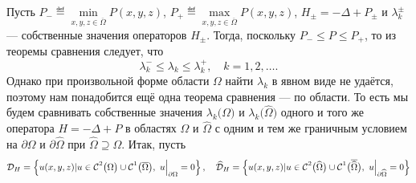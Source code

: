 Пусть $\displaystyle P_{-}\eqdef\min\limits_{x,y,z\in\overline{\Omega}}P(x,y,z)$, $\displaystyle P_{+}\eqdef\max\limits_{x,y,z\in\overline{\Omega}}P(x,y,z)$, $\displaystyle H_{\pm}=-\Delta+ P_{\pm}$  и $\lambda_k^{\pm}$ --- собственные значения операторов $H_{\pm}$. Тогда, поскольку $P_{-}\leqslant P\leqslant P_{+}$, то из теоремы сравнения следует, что
\begin{equation}\label{l10:eq:12a}
	\lambda_k^{-}\leqslant\lambda_k\leqslant\lambda_k^{+},\quad k=1,2,\ldots.
\end{equation} 
Однако при произвольной форме области $\Omega$ найти $\lambda_k$ в явном виде не удаётся, поэтому нам понадобится ещё одна теорема сравнения --- по области. То есть мы будем сравнивать собственные значения $\lambda_k\big(\Omega\big)$ и $\lambda_k\big(\widehat{\Omega}\big)$ одного и того же оператора $H=-\Delta+P$ в областях $\Omega$ и $\widehat{\Omega}$ с одним и тем же граничным условием на $\partial\Omega$ и $\partial\widehat{\Omega}$ при $\widehat{\Omega}\supseteq\Omega$. Итак, пусть
\begin{equation*}
	\hfill\mc{D}_{H}=\left\{u(x,y,z)|u\in\Cfn{2}\big(\Omega\big)\cup\Cfn{1}\big(\overline{\Omega}\big),\ u\Big|_{\partial\Omega}=0\right\},\quad\widehat{\mc{D}}_{H}=\left\{u(x,y,z)|u\in\Cfn{2}\big(\widehat{\Omega}\big)\cup\Cfn{1}\big(\overline{\widehat{\Omega}}\big),\ u\Big|_{\partial\widehat{\Omega}}=0\right\}
\end{equation*}  
